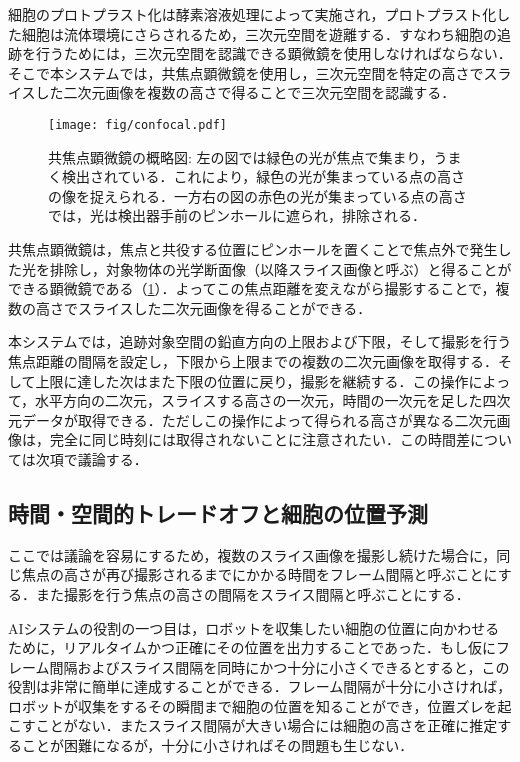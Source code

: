     細胞のプロトプラスト化は酵素溶液処理によって実施され，プロトプラスト化した細胞は流体環境にさらされるため，三次元空間を遊離する．すなわち細胞の追跡を行うためには，三次元空間を認識できる顕微鏡を使用しなければならない．そこで本システムでは，共焦点顕微鏡\cite{paddock2000principles}を使用し，三次元空間を特定の高さでスライスした二次元画像を複数の高さで得ることで三次元空間を認識する．

    \begin{figure}[t]
        \centering
        \texttt{[image: fig/confocal.pdf]}
        \caption[共焦点顕微鏡の概略図]{共焦点顕微鏡の概略図: 左の図では緑色の光が焦点で集まり，うまく検出されている．これにより，緑色の光が集まっている点の高さの像を捉えられる．一方右の図の赤色の光が集まっている点の高さでは，光は検出器手前のピンホールに遮られ，排除される．}
        \label{fig:confocal_microscope}
    \end{figure}

    共焦点顕微鏡は，焦点と共役する位置にピンホールを置くことで焦点外で発生した光を排除し，対象物体の光学断面像（以降スライス画像と呼ぶ）と得ることができる顕微鏡である（\ref{fig:confocal_microscope}）．よってこの焦点距離を変えながら撮影することで，複数の高さでスライスした二次元画像を得ることができる．

    本システムでは，追跡対象空間の鉛直方向の上限および下限，そして撮影を行う焦点距離の間隔を設定し，下限から上限までの複数の二次元画像を取得する．そして上限に達した次はまた下限の位置に戻り，撮影を継続する．この操作によって，水平方向の二次元，スライスする高さの一次元，時間の一次元を足した四次元データが取得できる．ただしこの操作によって得られる高さが異なる二次元画像は，完全に同じ時刻には取得されないことに注意されたい．この時間差については次項で議論する．

    \subsection{時間・空間的トレードオフと細胞の位置予測}

    ここでは議論を容易にするため，複数のスライス画像を撮影し続けた場合に，同じ焦点の高さが再び撮影されるまでにかかる時間をフレーム間隔と呼ぶことにする．また撮影を行う焦点の高さの間隔をスライス間隔と呼ぶことにする．

    AIシステムの役割の一つ目は，ロボットを収集したい細胞の位置に向かわせるために，リアルタイムかつ正確にその位置を出力することであった．もし仮にフレーム間隔およびスライス間隔を同時にかつ十分に小さくできるとすると，この役割は非常に簡単に達成することができる．フレーム間隔が十分に小さければ，ロボットが収集をするその瞬間まで細胞の位置を知ることができ，位置ズレを起こすことがない．またスライス間隔が大きい場合には細胞の高さを正確に推定することが困難になるが，十分に小さければその問題も生じない．

